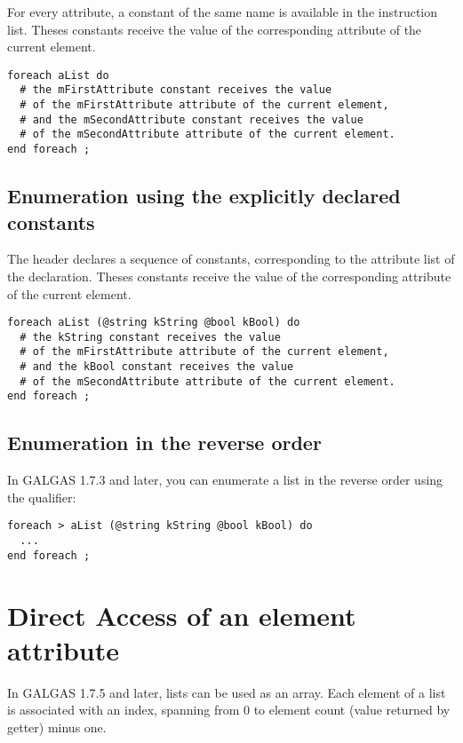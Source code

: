 For every attribute, a constant of the same name is available in the  instruction list. Theses constants receive the value of the corresponding attribute of the current element.

\begin{lstlisting}[language=galgas]
foreach aList do
  # the mFirstAttribute constant receives the value
  # of the mFirstAttribute attribute of the current element,
  # and the mSecondAttribute constant receives the value
  # of the mSecondAttribute attribute of the current element.
end foreach ;
\end{lstlisting}

\subsection{Enumeration using the explicitly declared constants}

The  header declares a sequence of constants, corresponding to the attribute list of the  declaration. Theses constants receive the value of the corresponding attribute of the current element.


\begin{lstlisting}[language=galgas]
foreach aList (@string kString @bool kBool) do
  # the kString constant receives the value
  # of the mFirstAttribute attribute of the current element,
  # and the kBool constant receives the value
  # of the mSecondAttribute attribute of the current element.
end foreach ;
\end{lstlisting}

\subsection{Enumeration in the reverse order}

In GALGAS 1.7.3 and later, you can enumerate a list in the reverse order using the \galgas{>} qualifier:

\begin{lstlisting}[language=galgas]
foreach > aList (@string kString @bool kBool) do
  ...
end foreach ;
\end{lstlisting}




\section{Direct Access of an element attribute}

In GALGAS 1.7.5 and later, lists can be used as an array. Each element of a list is associated with an  index, spanning from 0 to element count (value returned by  getter) minus one.

